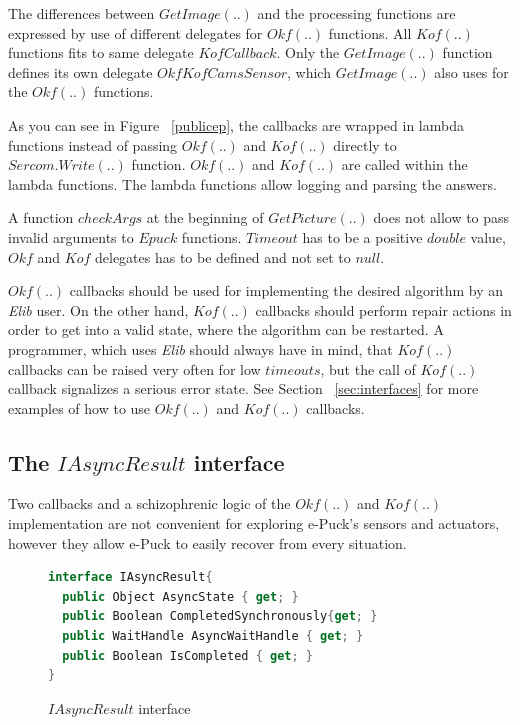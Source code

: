   The differences between $GetImage(..)$ and the processing functions are expressed by use of different
  delegates for $Okf(..)$ functions. All $Kof(..)$ functions fits to same delegate $KofCallback$. 
  Only the $GetImage(..)$ function defines its own delegate $OkfKofCamsSensor$, 
  which $GetImage(..)$ also uses for the $Okf(..)$ functions.

  As you can see in Figure ~\ref{publicep}, the callbacks are wrapped in lambda functions \cite{lambda}
  instead of passing $Okf(..)$ and $Kof(..)$ directly to $Sercom.Write(..)$ function.
  $Okf(..)$ and $Kof(..)$  are called within the lambda functions.
  The lambda functions allow logging and parsing the answers.

  A function $checkArgs$ at the beginning of $GetPicture(..)$ does not allow to pass invalid arguments
  to $Epuck$ functions. $Timeout$ has to be a positive $double$ value, $Okf$ and $Kof$ delegates 
  has to be defined and not set to $null$.

  $Okf(..)$ callbacks should be used for implementing the desired algorithm by an {\it Elib} user.
  On the other hand, $Kof(..)$ callbacks should perform repair actions in order to get into a valid state,
  where the algorithm can be restarted. A programmer, which uses {\it Elib} should always have in mind,
  that $Kof(..)$ callbacks can be raised very often for low $timeouts$,
  but the call of $Kof(..)$ callback signalizes a serious error state.
  See Section ~\ref{sec:interfaces} for more examples of how to use $Okf(..)$ and $Kof(..)$ callbacks.


\subsection{The $IAsyncResult$ interface} \label{sec:iasync}
  Two callbacks and a schizophrenic logic of the $Okf(..)$ and $Kof(..)$ implementation are not
  convenient for exploring e-Puck's sensors and actuators, 
  however they allow e-Puck to easily recover from every situation.

\begin{figure}[!hbp]
\begin{lstlisting}[language=cs]
interface IAsyncResult{
  public Object AsyncState { get; }
  public Boolean CompletedSynchronously{get; } 
  public WaitHandle AsyncWaitHandle { get; }
  public Boolean IsCompleted { get; }
}
\end{lstlisting}
\caption{$IAsyncResult$ interface}
\label{interface}
\end{figure}

